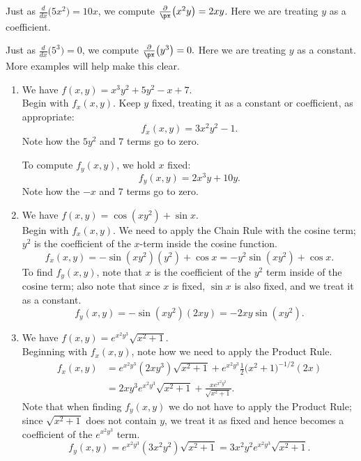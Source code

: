 Just as $\frac{d}{dx}\big(5x^2\big) = 10x$, we compute $\frac{\partial}{\px}\big(x^2y\big) = 2xy$. Here we are treating $y$ as a coefficient.

Just as $\frac{d}{dx}\big(5^3\big) = 0$, we compute $\frac{\partial}{\px}\big(y^3\big) = 0.$ Here we are treating $y$ as a constant. More examples will help make this clear.\\

{\begin{enumerate}
	\item We have $f(x,y) = x^3y^2+ 5y^2-x+7$.\\
	Begin with $f_x(x,y)$. Keep $y$ fixed, treating it as a constant or coefficient, as appropriate:
	$$f_x(x,y) = 3x^2y^2-1.$$ Note how the $5y^2$ and $7$ terms go to zero.
	
	To compute $f_y(x,y)$, we hold $x$ fixed:
	$$f_y(x,y) = 2x^3y+10y.$$ Note how the $-x$ and $7$ terms go to zero.
	
	\item We have $f(x,y) = \cos(xy^2)+\sin x$.\\
	Begin with $f_x(x,y)$. We need to apply the Chain Rule with the cosine term; $y^2$ is the coefficient of the $x$-term inside the cosine function.
	$$f_x(x,y) = -\sin(xy^2)(y^2)+\cos x = -y^2\sin(xy^2)+\cos x.$$
	To find $f_y(x,y)$, note that $x$ is the coefficient of the $y^2$ term inside of the cosine term; also note that since $x$ is fixed, $\sin x$ is also fixed, and we treat it as a constant.
	$$f_y(x,y) = -\sin(xy^2)(2xy) = -2xy\sin(xy^2).$$
	
	\item		We have $f(x,y) = e^{x^2y^3}\sqrt{x^2+1}$.\\
	Beginning with $f_x(x,y)$, note how we need to apply the Product Rule. 
	\begin{align*}
	f_x(x,y) &= e^{x^2y^3}(2xy^3)\sqrt{x^2+1} + e^{x^2y^3}\frac12\big(x^2+1\big)^{-1/2}(2x) \\
					&= 2xy^3e^{x^2y^3}\sqrt{x^2+1}+\frac{xe^{x^2y^3}}{\sqrt{x^2+1}}.
	\end{align*}
	Note that when finding $f_y(x,y)$ we do not have to apply the Product Rule; since $\sqrt{x^2+1}$ does not contain $y$, we treat it as fixed and hence becomes a coefficient of the $e^{x^2y^3}$ term.
	$$f_y(x,y) = e^{x^2y^3}(3x^2y^2)\sqrt{x^2+1} = 3x^2y^2e^{x^2y^3}\sqrt{x^2+1}.$$
\end{enumerate}
\baselineskip
}\\

